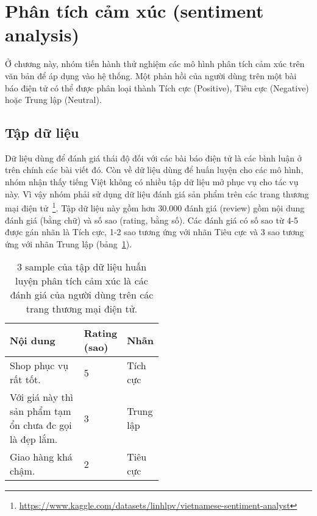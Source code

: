\section{Phân tích cảm xúc (sentiment analysis)}
Ở chương này, nhóm tiến hành thử nghiệm các mô hình phân tích cảm xúc trên văn bản để áp dụng vào hệ thống. Một phản hồi của người dùng trên một bài báo điện tử có thể được phân loại thành Tích cực (Positive), Tiêu cực (Negative) hoặc Trung lập (Neutral).

\subsection{Tập dữ liệu}
Dữ liệu dùng để đánh giá thái độ đối với các bài báo điện tử là các bình luận ở trên chính các bài viết đó. Còn về dữ liệu dùng để huấn luyện cho các mô hình, nhóm nhận thấy tiếng Việt không có nhiều tập dữ liệu mở phục vụ cho tác vụ này. Vì vậy nhóm phải sử dụng dữ liệu đánh giá sản phẩm trên các trang thương mại điện tử~\footnote{\url{https://www.kaggle.com/datasets/linhlpv/vietnamese-sentiment-analyst}}. Tập dữ liệu này gồm hơn 30.000 đánh giá (review) gồm nội dung đánh giá (bằng chữ) và số sao (rating, bằng số). Các đánh giá có số sao từ 4-5 được gán nhãn là Tích cực, 1-2 sao tương ứng với nhãn Tiêu cực và 3 sao tương ứng với nhãn Trung lập (bảng~\ref{table:sentiment-data-sample}).

\begin{table}[ht!]
    \centering
    \small
    \begin{tabular}{|p{0.5\linewidth}|l|l|}
    \hline
    \textbf{Nội dung}                                                                            & \textbf{Rating (sao)} & \textbf{Nhãn} \\ \hline
    Shop phục vụ rất tốt.                                                                        & 5                     & Tích cực            \\ \hline
    Với giá này thì sản phẩm tạm ổn chưa đc gọi là đẹp lắm. & 3                     & Trung lập            \\ \hline
    Giao hàng khá chậm.                                                                          & 2                     & Tiêu cực            \\ \hline
    \end{tabular}
    \caption{3 sample của tập dữ liệu huấn luyện phân tích cảm xúc là các đánh giá của người dùng trên các trang thương mại điện tử.}
    \label{table:sentiment-data-sample}
\end{table}

